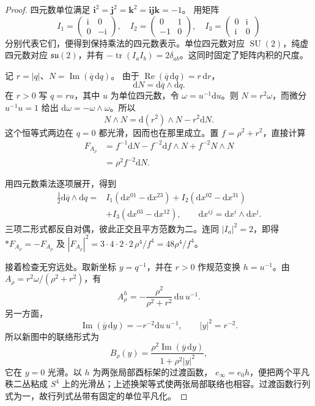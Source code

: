 \begin{proof}
	四元数单位满足
	\(\mathbf i^2=\mathbf j^2=\mathbf k^2=\mathbf i\mathbf j\mathbf k=-1\)。
	用矩阵
	\[
		I_1=\begin{pmatrix}\mathrm i&0\\0&-\mathrm i\end{pmatrix},
		\quad I_2=\begin{pmatrix}0&1\\-1&0\end{pmatrix},
		\quad I_3=\begin{pmatrix}0&\mathrm i\\\mathrm i&0\end{pmatrix}
	\]
	分别代表它们，便得到保持乘法的四元数表示。单位四元数对应 \(\operatorname{SU}(2)\)，纯虚四元数对应 \(\mathfrak{su}(2)\)，并有
	\(-\operatorname{tr}(I_aI_b)=2\delta_{ab}\)。这同时固定了矩阵内积的尺度。

	记 \(r=|q|\)、\(N=\operatorname{Im}(\overline q\,\mathrm dq)\)。
	由于 \(\operatorname{Re}(\overline q\,\mathrm dq)=r\,\mathrm dr\)，
	\[
		\mathrm dN=\mathrm d\overline q\wedge\mathrm dq.
	\]
	在 \(r>0\) 写 \(q=ru\)，其中 \(u\) 为单位四元数，令
	\(\omega=u^{-1}\mathrm du\)。则 \(N=r^2\omega\)，而微分
	\(u^{-1}u=1\) 给出
	\(\mathrm d\omega=-\omega\wedge\omega\)。所以
	\[
		N\wedge N
		=\mathrm d(r^2)\wedge N-r^2\mathrm dN.
	\]
	这个恒等式两边在 \(q=0\) 都光滑，因而也在那里成立。置 \(f=\rho^2+r^2\)，直接计算
	\[
	\begin{aligned}
		F_{A_\rho}
		&=f^{-1}\mathrm dN-f^{-2}\mathrm df\wedge N
		                      +f^{-2}N\wedge N\\
		&=\rho^2f^{-2}\mathrm dN.
	\end{aligned}
	\]

	用四元数乘法逐项展开，得到
	\[
	\begin{aligned}
		\tfrac12\mathrm d\overline q\wedge\mathrm dq
		={}&I_1(\mathrm dx^{01}-\mathrm dx^{23})
		  +I_2(\mathrm dx^{02}-\mathrm dx^{31})\\
		&+I_3(\mathrm dx^{03}-\mathrm dx^{12}),
		\qquad \mathrm dx^{ij}=\mathrm dx^i\wedge\mathrm dx^j.
	\end{aligned}
	\]
	三项二形式都反自对偶，彼此正交且平方范数为二。连同
	\(|I_a|^2=2\)，即得 \(*F_{A_\rho}=-F_{A_\rho}\) 及
	\(|F_{A_\rho}|^2=3\cdot4\cdot2\cdot2\,\rho^4/f^4=48\rho^4/f^4\)。

	接着检查无穷远处。取新坐标 \(y=q^{-1}\)，并在 \(r>0\) 作规范变换 \(h=u^{-1}\)。由 \(A_\rho=r^2\omega/(\rho^2+r^2)\)，有
	\[
		A_\rho^h
		=-\frac{\rho^2}{\rho^2+r^2}\,\mathrm du\,u^{-1}.
	\]
	另一方面，
	\[
		\operatorname{Im}(\overline y\,\mathrm dy)
		=-r^{-2}\mathrm du\,u^{-1},
		\qquad |y|^2=r^{-2}.
	\]
	所以新图中的联络形式为
	\[
		B_\rho(y)
		=\frac{\rho^2\operatorname{Im}(\overline y\,\mathrm dy)}
		              {1+\rho^2|y|^2},
	\]
	它在 \(y=0\) 光滑。以 \(h\) 为两张局部酉标架的过渡函数，
	\(e_\infty=e_0h\)，便把两个平凡秩二丛粘成 \(S^4\) 上的光滑丛；上述换架等式使两张局部联络也相容。过渡函数行列式为一，故行列式丛带有固定的单位平凡化。


\end{proof}
